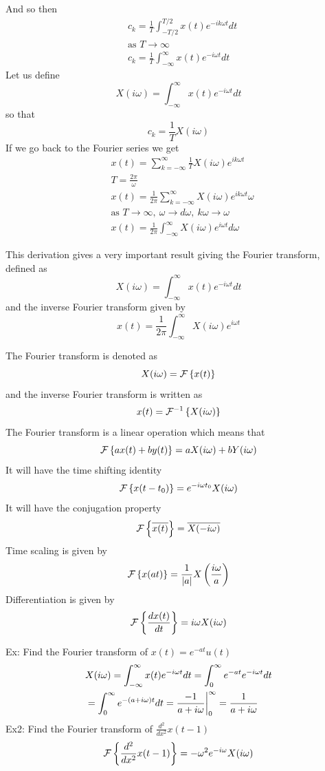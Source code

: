 \documentclass[11pt, fleqn]{article}
\begin{document}
And so then
\begin{align*}
    &c_k=\frac{1}{T}\int_{-T/2}^{T/2}x(t)e^{-ik\omega t}dt\\
    &\text{as }T\to\infty\\
    &c_k=\frac{1}{T}\int_{-\infty}^\infty x(t)e^{-i\omega t}dt
\end{align*}
Let us define
$$X(i\omega)=\int_{-\infty}^\infty x(t)e^{-i\omega t}dt$$
so that
$$c_k=\frac{1}{T}X(i\omega)$$
If we go back to the Fourier series we get
\begin{align*}
    &x(t)=\sum_{k=-\infty}^\infty \frac{1}{T}X(i\omega)e^{ik\omega t}\\
    &T=\frac{2\pi}{\omega}\\
    &x(t)=\frac{1}{2\pi}\sum_{k=-\infty}^\infty X(i\omega)e^{ik\omega t}\omega\\
    &\text{as }T\to\infty,\ \omega\to d\omega,\ k\omega\to \omega\\
    &x(t)=\frac{1}{2\pi}\int_{-\infty}^\infty X(i\omega)e^{i\omega t}d\omega
\end{align*}

This derivation gives a very important result giving the Fourier transform, defined as
$$\boxed{X(i\omega)=\int_{-\infty}^\infty x(t)e^{-i\omega t}dt}$$
and the inverse Fourier transform given by
$$\boxed{x(t)=\frac{1}{2\pi}\int_{-\infty}^\infty X(i\omega)e^{i\omega t}}$$

The Fourier transform is denoted as
$$X(i\omega)=\F\brcurly{x(t)}$$
and the inverse Fourier transform is written as
$$x(t)=\F^{-1}\brcurly{X(i\omega)}$$
The Fourier transform is a linear operation which means that
$$\F\brcurly{ax(t)+by(t)}=aX(i\omega)+bY(i\omega)$$
It will have the time shifting identity
$$\F\brcurly{x(t-t_0)}=e^{-i\omega t_0}X(i\omega)$$
It will have the conjugation property
$$\F\brcurly{\overline{x(t)}}=\overline{X(-i\omega)}$$
Time scaling is given by
$$\F\brcurly{x(at)}=\frac{1}{|a|}X\brround{\frac{i\omega}{a}}$$
Differentiation is given by
$$\F\brcurly{\ddx[x(t)]{t}}=i\omega X(i\omega)$$

Ex: Find the Fourier transform of $x(t)=e^{-at}u(t)$
\begin{align*}
    &X(i\omega)=\int_{-\infty}^\infty x(t)e^{-i\omega t}dt=\int_0^\infty e^{-at}e^{-i\omega t}dt\\
    &=\int_0^\infty e^{-(a+i\omega)t}dt=\frac{-1}{a+i\omega}\eval_0^\infty=\frac{1}{a+i\omega}
\end{align*}
Ex2: Find the Fourier transform of $\frac{d^2}{dx^2}x(t-1)$
\[ \F\brcurly{\frac{d^2}{dx^2}x(t-1)}=-\omega^2e^{-i\omega}X(i\omega) \]
\end{document}
